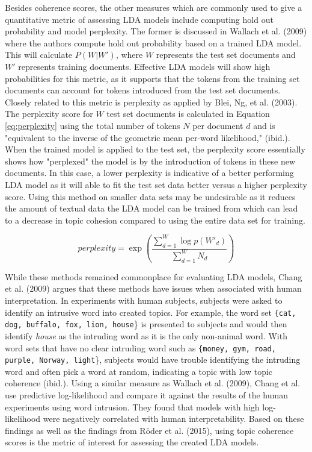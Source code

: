 \documentclass[a4paper, 12pt, twoside]{article}
\numberwithin{equation}{section} %
\begin{document}
Besides coherence scores, the other measures which are commonly used to give a quantitative metric of assessing LDA models include computing hold out probability and model perplexity. The former is discussed in Wallach et al. (2009) \nocite{wallach2009} where the authors compute hold out probability based on a trained LDA model. This will calculate $P(W|W')$, where $W$ represents the test set documents and $W'$ represents training documents. Effective LDA models will show high probabilities for this metric, as it supports that the tokens from the training set documents can account for tokens introduced from the test set documents. Closely related to this metric is perplexity as applied by Blei, Ng, et al. (2003). The perplexity score for $W$ test set documents is calculated in Equation \ref{eq:perplexity} using the total number of tokens $N$ per document $d$ and is "equivalent to the inverse of the geometric mean per-word likelihood," (ibid.). When the trained model is applied to the test set, the perplexity score essentially shows how "perplexed" the model is by the introduction of tokens in these new documents. In this case, a lower perplexity is indicative of a better performing LDA model as it will able to fit the test set data better versus a higher perplexity score. Using this method on smaller data sets may be undesirable as it reduces the amount of textual data the LDA model can be trained from which can lead to a decrease in topic cohesion compared to using the entire data set for training.

\begin{equation} \label{eq:perplexity}
perplexity = \exp\left({\frac {\sum_{d=1}^W\log{p(W'_d)}}{\sum_{d=1}^W N_d}}\right)
\end{equation}

While these methods remained commonplace for evaluating LDA models, Chang et al. (2009) \nocite{Chang2009} argues that these methods have issues when associated with human interpretation. In experiments with human subjects, subjects were asked to identify an intrusive word into created topics. For example, the word set \texttt{\{cat, dog, buffalo, fox, lion, house}\} is presented to subjects and would then identify \textit{house} as the intruding word as it is the only non-animal word. With word sets that have no clear intruding word such as \texttt{\{money, gym, road, purple, Norway, light}\}, subjects would have trouble identifying the intruding word and often pick a word at random, indicating a topic with low topic coherence (ibid.). Using a similar measure as Wallach et al. (2009), Chang et al. use predictive log-likelihood and compare it against the results of the human experiments using word intrusion. They found that models with high log-likelihood were negatively correlated with human interpretability. Based on these findings as well as the findings from Röder et al. (2015), using topic coherence scores is the metric of interest for assessing the created LDA models. 
\end{document}
